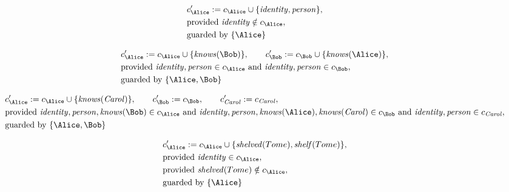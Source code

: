 \begin{align*}
&
c'_
{
\Alice
}
 := 
c_
{
\Alice
}
 \cup 
\{
\mathit{\detokenize{
identity
}}
,
\mathit{\detokenize{
person
}}
\}
,\\
&
\text{provided } 
\mathit{\detokenize{
identity
}}
 \notin c_
{
\Alice
}
,\\
&
\text{guarded by } \{
\Alice
\}
\end{align*}

\begin{align*}
&
c'_
{
\Alice
}
 := 
c_
{
\Alice
}
 \cup 
\{
\mathit{\detokenize{
knows
}}
(
\Bob
)
\}
, \qquad 
c'_
{
\Bob
}
 := 
c_
{
\Bob
}
 \cup 
\{
\mathit{\detokenize{
knows
}}
(
\Alice
)
\}
,\\
&
\text{provided } 
\mathit{\detokenize{
identity
}}
,
\mathit{\detokenize{
person
}}
 \in c_
{
\Alice
}
 \text{ and } 
\mathit{\detokenize{
identity
}}
,
\mathit{\detokenize{
person
}}
 \in c_
{
\Bob
}
,\\
&
\text{guarded by } \{
\Alice
,
\Bob
\}
\end{align*}

\begin{align*}
&
c'_
{
\Alice
}
 := 
c_
{
\Alice
}
 \cup 
\{
\mathit{\detokenize{
knows
}}
(
\mathit{Carol}
)
\}
, \qquad 
c'_
{
\Bob
}
 := 
c_
{
\Bob
}
, \qquad 
c'_
{
\mathit{Carol}
}
 := 
c_
{
\mathit{Carol}
}
,\\
&
\text{provided } 
\mathit{\detokenize{
identity
}}
,
\mathit{\detokenize{
person
}}
,
\mathit{\detokenize{
knows
}}
(
\Bob
)
 \in c_
{
\Alice
}
 \text{ and } 
\mathit{\detokenize{
identity
}}
,
\mathit{\detokenize{
person
}}
,
\mathit{\detokenize{
knows
}}
(
\Alice
)
,
\mathit{\detokenize{
knows
}}
(
\mathit{Carol}
)
 \in c_
{
\Bob
}
 \text{ and } 
\mathit{\detokenize{
identity
}}
,
\mathit{\detokenize{
person
}}
 \in c_
{
\mathit{Carol}
}
,\\
&
\text{guarded by } \{
\Alice
,
\Bob
\}
\end{align*}

\begin{align*}
&
c'_
{
\Alice
}
 := 
c_
{
\Alice
}
 \cup 
\{
\mathit{\detokenize{
shelved
}}
(
Tome
)
,
\mathit{\detokenize{
shelf
}}
(
Tome
)
\}
,\\
&
\text{provided } 
\mathit{\detokenize{
identity
}}
 \in c_
{
\Alice
}
,\\
&
\text{provided } 
\mathit{\detokenize{
shelved
}}
(
Tome
)
 \notin c_
{
\Alice
}
,\\
&
\text{guarded by } \{
\Alice
\}
\end{align*}

